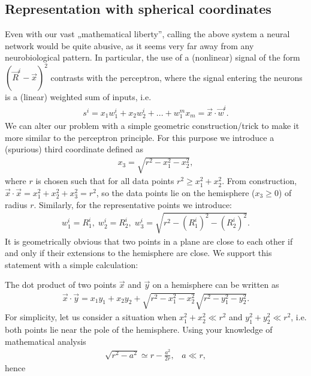 \documentclass[a4paper,12pt,polish]{jupyterBook}
\begin{document}
\subsection{Representation with spherical coordinates}
\label{\detokenize{docs/unsupervised:representation-with-spherical-coordinates}}
\sphinxAtStartPar
Even with our vast „mathematical liberty”, calling the above system a neural network would be quite abusive, as it seems very far away from any neurobiological pattern. In particular, the use of a (non\sphinxhyphen{}linear) signal of the form \(\left(\vec{R}^i-\vec{x}\right)^2\) contrasts with the perceptron, where the signal entering the neurons is a (linear) weighted sum of inputs, i.e.
\begin{equation*}
\begin{split} s ^ i = x_1 w_1 ^ i + x_2 w_2 ^ i + ... + w_1 ^ m x_m = \vec {x} \cdot \vec {w} ^ i. \end{split}
\end{equation*}
\sphinxAtStartPar
We can alter our problem with a simple geometric construction/trick to make it more similar to the perceptron principle. For this purpose we introduce a (spurious) third coordinate defined as
\begin{equation*}
\begin{split} x_3 = \sqrt {r ^ 2-x_1 ^ 2-x_2 ^ 2}, \end{split}
\end{equation*}
\sphinxAtStartPar
where \( r \) is chosen such that for all data points \( r ^ 2 \ge x_1 ^ 2 + x_2 ^ 2 \).
From construction, \( \vec {x} \cdot \vec {x} = x_1 ^ 2 + x_2 ^ 2 + x_3 ^ 2 = r ^ 2 \), so the data points lie on the hemisphere (\( x_3 \ge 0 \)) of radius \( r \). Similarly, for the representative points we introduce:
\begin{equation*}
\begin{split} w_1 ^ i = R_1 ^ i,  \; w_2 ^ i = R_2 ^ i,  \; 
w_3 ^ i = \sqrt {r ^ 2-(R_1 ^i)^2 -(R_2 ^i)^2}. \end{split}
\end{equation*}
\sphinxAtStartPar
It is geometrically obvious that two points in a plane are close to each other if and only if their extensions to the hemisphere are close. We support this statement with a simple calculation:

\sphinxAtStartPar
The dot product of two points \( \vec {x} \) and \( \vec {y} \) on a hemisphere can be written as
\begin{equation*}
\begin{split} \vec {x} \cdot \vec {y} = x_1 y_1 + x_2 y_2 + \sqrt {r ^ 2-x_1 ^ 2-x_2 ^ 2} \sqrt {r ^ 2-y_1 ^ 2-y_2 ^ 2}. \end{split}
\end{equation*}
\sphinxAtStartPar
For simplicity, let us consider a situation when \( x_1 ^ 2 + x_2 ^ 2 \ll r ^ 2 \) and \( y_1 ^ 2 + y_2 ^ 2 \ll r ^ 2 \), i.e. both points lie near the pole of the hemisphere. Using your knowledge of mathematical analysis
\begin{equation*}
\begin{split} \sqrt{r^2-a^2} \simeq r - \frac{a^2}{2r},  \;\;\;a \ll r, \end{split}
\end{equation*}
\sphinxAtStartPar
hence
\end{document}
